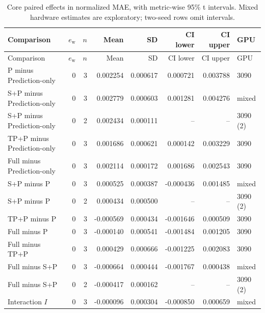 \documentclass[a4paper,10pt]{article}
\begin{document}
\begingroup\footnotesize\setlength{\tabcolsep}{4pt}
\begin{longtable}{p{42mm}rrrrrrl}
\caption{Core paired effects in normalized MAE, with metric-wise 95\% t intervals. Mixed hardware estimates are exploratory; two-seed rows omit intervals.}\\
\toprule
Comparison & $e_{\mathrm{w}}$ & $n$ & Mean & SD & CI lower & CI upper & GPU \\
\midrule\endfirsthead
\toprule
Comparison & $e_{\mathrm{w}}$ & $n$ & Mean & SD & CI lower & CI upper & GPU \\
\midrule\endhead

P minus Prediction-only & 0 & 3 & 0.002254 & 0.000617 & 0.000721 & 0.003788 & 3090 \\

S+P minus Prediction-only & 0 & 3 & 0.002779 & 0.000603 & 0.001281 & 0.004276 & mixed \\

S+P minus Prediction-only & 0 & 2 & 0.002434 & 0.000111 & -- & -- & 3090 (2) \\

TP+P minus Prediction-only & 0 & 3 & 0.001686 & 0.000621 & 0.000142 & 0.003229 & 3090 \\

Full minus Prediction-only & 0 & 3 & 0.002114 & 0.000172 & 0.001686 & 0.002543 & 3090 \\

S+P minus P & 0 & 3 & 0.000525 & 0.000387 & -0.000436 & 0.001485 & mixed \\

S+P minus P & 0 & 2 & 0.000434 & 0.000500 & -- & -- & 3090 (2) \\

TP+P minus P & 0 & 3 & -0.000569 & 0.000434 & -0.001646 & 0.000509 & 3090 \\

Full minus P & 0 & 3 & -0.000140 & 0.000541 & -0.001484 & 0.001205 & 3090 \\

Full minus TP+P & 0 & 3 & 0.000429 & 0.000666 & -0.001225 & 0.002083 & 3090 \\

Full minus S+P & 0 & 3 & -0.000664 & 0.000444 & -0.001767 & 0.000438 & mixed \\

Full minus S+P & 0 & 2 & -0.000417 & 0.000162 & -- & -- & 3090 (2) \\

Interaction $I$ & 0 & 3 & -0.000096 & 0.000304 & -0.000850 & 0.000659 & mixed \\


\end{longtable}
\end{document}
